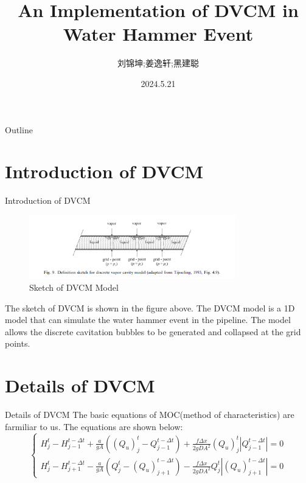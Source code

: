 \documentclass[UTF8]{ctexbeamer}
\title{An Implementation of DVCM in Water Hammer Event}
\author{刘锦坤;姜逸轩;黑建聪}
\institute{Tsinghua University}
\date{2024.5.21}
\begin{document}
\begin{frame}
    \titlepage
\end{frame}

\begin{frame}{Outline}
    \tableofcontents
\end{frame}

\section{Introduction of DVCM}

\begin{frame}{Introduction of DVCM}
    \begin{figure}
        \centering
        \includegraphics[width=0.8\textwidth]{pic/DVCM_Model.png}
        \caption{Sketch of DVCM Model}
    \end{figure}
    The sketch of DVCM is shown in the figure above. The DVCM model is a 1D model that can simulate the water hammer event in the pipeline. The model allows the discrete cavitation bubbles to be generated and collapsed at the grid points.
\end{frame}

\section{Details of DVCM}

\begin{frame}{Details of DVCM}
    The basic equations of MOC(method of characteristics) are farmiliar to us. The equations are shown below:
    \begin{equation}
        \begin{cases}
            H^t_j-H^{t-\Delta t}_{j-1}+\frac{a}{gA}({(Q_u)}^t_j-Q^{t-\Delta t}_{j-1})+\frac{f\Delta x}{2 g D A^2}{(Q_u)}^t_j|Q^{t-\Delta t}_{j-1}|=0\\
            H^t_j-H^{t-\Delta t}_{j+1}-\frac{a}{gA}(Q^t_j-{(Q_u)}^{t-\Delta t}_{j+1})-\frac{f\Delta x}{2 g D A^2}Q^t_j|{(Q_u)}^{t-\Delta t}_{j+1}|=0
        \end{cases}
    \end{equation}
\end{frame}
\end{document}
